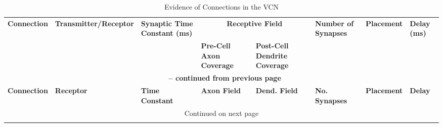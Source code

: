 \begin{longtable}{XXXXXXXX}%
%
\caption{Evidence of Connections in the VCN}\label{tab:Connections} \\
\toprule  {\textbf{Connection}} & {\textbf{Transmitter\slash Receptor}} & {\textbf{Synaptic Time Constant (ms)}} & \multicolumn{2}{c}{\textbf{Receptive Field}} & {\textbf{Number of Synapses}} & {\textbf{Placement}} & {\textbf{Delay (ms)}}\\
&&& {\textbf{Pre-Cell Axon Coverage}} & {\textbf{Post-Cell Dendrite Coverage}} &&& \\ \midrule 
\endfirsthead

\multicolumn{8}{c}{{\bfseries \tablename\ \thetable{} -- continued from previous page}} \\
\midrule {\textbf{Connection}} & {\textbf{Receptor}} & {\textbf{Time Constant}} & {\textbf{Axon Field}}& {\textbf{Dend. Field}} & {\textbf{No. Synapses}} & {\textbf{Placement}} & {\textbf{Delay}} \\ \midrule 
\endhead

\midrule \multicolumn{8}{c}{{Continued on next page}} \\ %
\endfoot
\bottomrule
\endlastfoot


\end{longtable}
